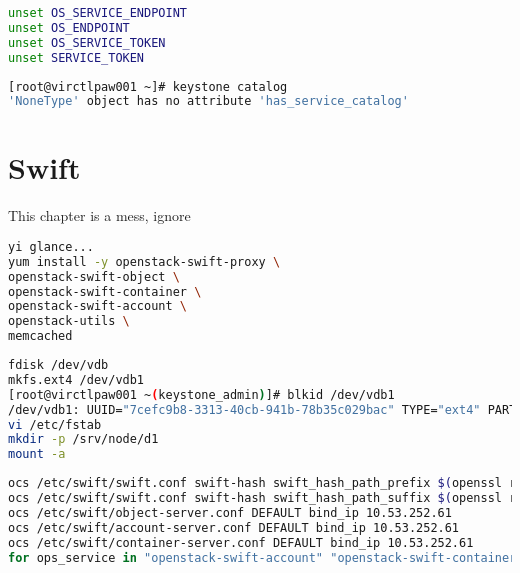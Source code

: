 \documentclass[11pt,letterpaper,oneside]{book}
\begin{document}
\begin{lstlisting}[caption={Unset Environment variables},language=bash]
unset OS_SERVICE_ENDPOINT
unset OS_ENDPOINT
unset OS_SERVICE_TOKEN
unset SERVICE_TOKEN
\end{lstlisting}

\begin{flushleft}
\end{flushleft}


\begin{lstlisting}[caption={Keystone Error Message},language=bash]
[root@virctlpaw001 ~]# keystone catalog 
'NoneType' object has no attribute 'has_service_catalog'
\end{lstlisting}

\chapter{Swift}

\begin{huge} \danger \end{huge} This chapter is a mess, ignore
\begin{lstlisting}[caption={Install Swift},language=bash]
yi glance...
yum install -y openstack-swift-proxy \
openstack-swift-object \
openstack-swift-container \
openstack-swift-account \
openstack-utils \
memcached
\end{lstlisting}

\begin{lstlisting}[caption={Install Swift},language=bash]
fdisk /dev/vdb
mkfs.ext4 /dev/vdb1 
[root@virctlpaw001 ~(keystone_admin)]# blkid /dev/vdb1 
/dev/vdb1: UUID="7cefc9b8-3313-40cb-941b-78b35c029bac" TYPE="ext4" PARTUUID="9faed234-01" 
vi /etc/fstab 
mkdir -p /srv/node/d1
mount -a
\end{lstlisting}

\begin{lstlisting}[caption={Swift account, container, object},language=bash]
ocs /etc/swift/swift.conf swift-hash swift_hash_path_prefix $(openssl rand -hex 10)
ocs /etc/swift/swift.conf swift-hash swift_hash_path_suffix $(openssl rand -hex 10)
ocs /etc/swift/object-server.conf DEFAULT bind_ip 10.53.252.61
ocs /etc/swift/account-server.conf DEFAULT bind_ip 10.53.252.61
ocs /etc/swift/container-server.conf DEFAULT bind_ip 10.53.252.61
for ops_service in "openstack-swift-account" "openstack-swift-container" "openstack-swift-object"; do systemctl enable $ops_service; systemctl start $ops_service; done
\end{lstlisting}
\end{document}

